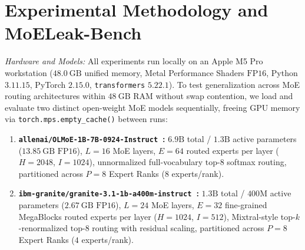 \documentclass[final,5p,times,twocolumn]{elsarticle}
\theoremstyle{definition}
\theoremstyle{remark}
\begin{document}
\section{Experimental Methodology and MoELeak-Bench}\label{sec:methodology}

\emph{Hardware and Models:} All experiments run locally on an Apple M5 Pro workstation ($48.0~\mathrm{GB}$ unified memory, Metal Performance Shaders $\mathrm{FP16}$, Python $3.11.15$, PyTorch $2.15.0$, \texttt{transformers} $5.22.1$). To test generalization across MoE routing architectures within $48~\mathrm{GB}$ RAM without swap contention, we load and evaluate two distinct open-weight MoE models sequentially, freeing GPU memory via \texttt{torch.mps.empty\_cache()} between runs:
\begin{enumerate}
  \item \textbf{\texttt{allenai/OLMoE-1B-7B-0924-Instruct}~\cite{muennighoff2025olmoe}:} $6.9\mathrm{B}$ total / $1.3\mathrm{B}$ active parameters ($13.85~\mathrm{GB}$ $\mathrm{FP16}$), $L=16$ MoE layers, $E=64$ routed experts per layer ($H=2048$, $I=1024$), unnormalized full-vocabulary $\text{top-}8$ softmax routing, partitioned across $P=8$ Expert Ranks ($8$ experts/rank).
  \item \textbf{\texttt{ibm-granite/}\allowbreak\texttt{granite-3.1-}\allowbreak\texttt{1b-a400m-instruct}~\cite{gale2023megablocks}:} $1.3\mathrm{B}$ total / $400\mathrm{M}$ active parameters ($2.67~\mathrm{GB}$ $\mathrm{FP16}$), $L=24$ MoE layers, $E=32$ fine-grained MegaBlocks routed experts per layer ($H=1024$, $I=512$), Mixtral-style top-$k$-renormalized $\text{top-}8$ routing with residual scaling, partitioned across $P=8$ Expert Ranks ($4$ experts/rank).
\end{enumerate}
\end{document}
